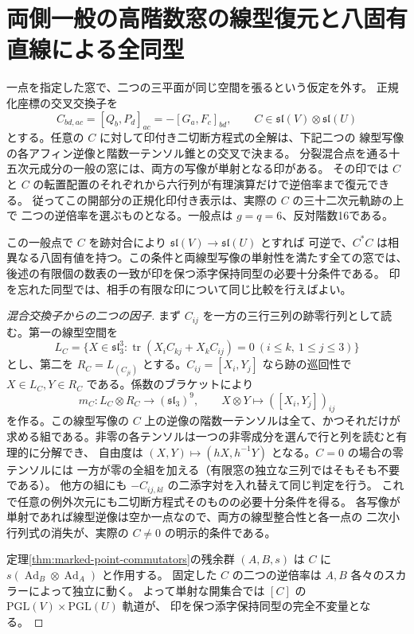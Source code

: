 \section{両側一般の高階数窓の線型復元と八固有直線による全同型}
\label{sec:marked-mixed-bracket-reconstruction}
\begin{theorem}\label{thm:marked-mixed-bracket-reconstruction}
一点を指定した窓で、二つの三平面が同じ空間を張るという仮定を外す。
正規化座標の交叉交換子を
\[
  C_{bd,ac}=[Q_b,P_d]_{ac}=-[G_a,F_c]_{bd},
  \qquad C\in\mathfrak{sl}(V)\otimes\mathfrak{sl}(U)
\]
とする。任意の $C$ に対して印付き二切断方程式の全解は、下記二つの
線型写像の各アフィン逆像と階数一テンソル錐との交叉で決まる。
分裂混合点を通る十五次元成分の一般の窓には、両方の写像が単射となる印がある。
その印では $C$ と $C$ の転置配置のそれぞれから六行列が有理演算だけで逆倍率まで復元できる。
従ってこの開部分の正規化印付き表示は、実際の $C$ の三十二次元軌跡の上で
二つの逆倍率を選ぶものとなる。一般点は $g=q=6$、反対階数16である。

この一般点で $C$ を跡対合により $\mathfrak{sl}(V)\to\mathfrak{sl}(U)$ とすれば
可逆で、$C^*C$ は相異なる八固有値を持つ。この条件と両線型写像の単射性を満たす全ての窓では、
後述の有限個の数表の一致が印を保つ添字保持同型の必要十分条件である。
印を忘れた同型では、相手の有限な印について同じ比較を行えばよい。
\end{theorem}

\begin{proof}[混合交換子からの二つの因子]
まず $C_{ij}$ を一方の三行三列の跡零行列として読む。第一の線型空間を
\[
 L_C=\{X\in\mathfrak{sl}_3^3:
       \operatorname{tr}(X_i C_{kj}+X_k C_{ij})=0\ (i\le k,\ 1\le j\le3)\}
\]
とし、第二を $R_C=L_{(C_{ji})}$ とする。$C_{ij}=[X_i,Y_j]$ なら跡の巡回性で
$X\in L_C,Y\in R_C$ である。係数のブラケットにより
\[
  m_C:L_C\otimes R_C\longrightarrow (\mathfrak{sl}_3)^9,\qquad
                  X\otimes Y\longmapsto ([X_i,Y_j])_{ij}
\]
を作る。この線型写像の $C$ 上の逆像の階数一テンソルは全て、かつそれだけが
求める組である。非零の各テンソルは一つの非零成分を選んで行と列を読むと有理的に分解でき、
自由度は $(X,Y)\mapsto(hX,h^{-1}Y)$ となる。$C=0$ の場合の零テンソルには
一方が零の全組を加える（有限窓の独立な三列ではそもそも不要である）。
他方の組にも $-C_{ij,kl}$ の二添字対を入れ替えて同じ判定を行う。
これで任意の例外次元にも二切断方程式そのものの必要十分条件を得る。
各写像が単射であれば線型逆像は空か一点なので、両方の線型整合性と各一点の
二次小行列式の消失が、実際の $C\ne0$ の明示的条件である。

定理\ref{thm:marked-point-commutators}の残余群 $(A,B,s)$ は $C$ に
$s(\operatorname{Ad}_B\otimes\operatorname{Ad}_A)$ と作用する。
固定した $C$ の二つの逆倍率は $A,B$ 各々のスカラーによって独立に動く。
よって単射な開集合では $[C]$ の $\mathrm{PGL}(V)\times\mathrm{PGL}(U)$ 軌道が、
印を保つ添字保持同型の完全不変量となる。
\end{proof}

